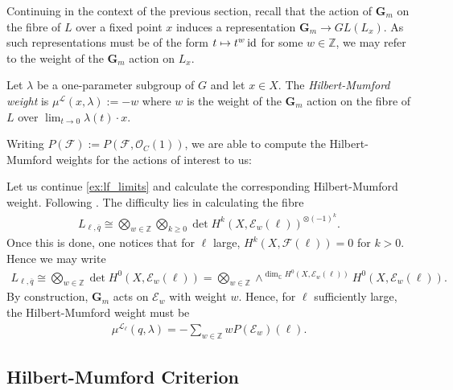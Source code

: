 \documentclass[12pt]{ociamthesis}  %
\begin{document}
Continuing in the context of the previous section, recall that the action
of $\mathbf G_m$ on the fibre of $L$ over a fixed point $x$ induces a
representation $\mathbf G_m\to GL(L_x)$. As such representations must
be of the form $t \mapsto t^w\operatorname{id}$ for some $w\in\mathbb Z$,
we may refer to the weight of the $\mathbf G_m$ action on $L_x$.

\begin{definition}
  Let $\lambda$ be a one-parameter subgroup of $G$ and let
  $x\in X$. The \emph{Hilbert-Mumford weight}
  is $\mu^{\mathscr L}(x,\lambda) := -w$ where $w$ is the weight of the
  $\mathbf G_m$ action on the fibre of $L$ over $\lim_{t\to 0}\lambda(t)\cdot x$.
\end{definition}

Writing $P(\mathscr F) := P(\mathscr F,\mathscr O_C(1))$, we are
able to compute the Hilbert-Mumford weights for the actions of
interest to us:

\begin{example}\label{ex:lf_hm_weight}
  Let us continue \ref{ex:lf_limits} and calculate the corresponding
  Hilbert-Mumford weight. Following \cite[Lemma 8.52]{hoskins2016}.
  The difficulty lies
  in calculating the fibre
  \begin{align*}
    L_{\ell,\overline q} \cong \bigotimes_{w\in\mathbb Z}\bigotimes_{k\geq 0} \det H^k(X,\mathscr E_w(\ell))^{\otimes(-1)^k}.
  \end{align*}
  Once this is done, one notices that for $\ell$ large,
  $H^k(X,\mathscr F(\ell))=0$ for $k>0$. Hence we may write
  \begin{align*}
    L_{\ell,\overline q}
    \cong \bigotimes_{w\in\mathbb Z}\det H^0(X,\mathscr E_w(\ell))
    = \bigotimes_{w\in\mathbb Z}\wedge^{\dim_{\mathbb C}H^0(X,\mathscr E_w(\ell))} H^0(X,\mathscr E_w(\ell)).
  \end{align*}
  By construction, $\mathbf G_m$ acts on $\mathscr E_w$ with weight
  $w$. Hence, for $\ell$ sufficiently large, the Hilbert-Mumford
  weight must be
  \begin{align*}
    \mu^{\mathscr L_\ell}(q,\lambda) =
    -\sum_{w\in\mathbb Z} w P(\mathscr E_w)(\ell).
  \end{align*}
\end{example}

\begin{example}
  \missingexample
\end{example}

\subsection{Hilbert-Mumford Criterion}
\end{document}
